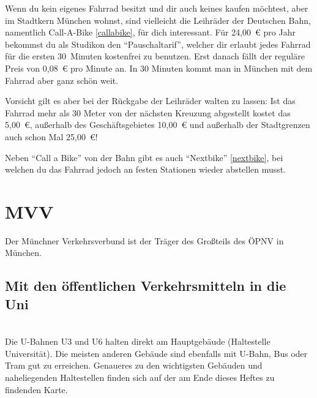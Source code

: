 Wenn du kein eigenes Fahrrad besitzt und dir auch keines kaufen möchtest, aber im
Stadtkern München wohnst, sind vielleicht die Leihräder der Deutschen Bahn,
namentlich Call-A-Bike \ref{callabike}, für dich interessant. Für 24,00~€ pro
Jahr bekommst du als Studikon den ``Pauschaltarif'', welcher dir erlaubt jedes
Fahrrad für die ersten 30~Minuten kostenfrei zu benutzen. Erst danach fällt der
reguläre Preis von 0,08~€ pro Minute an. In 30 Minuten kommt man in München mit dem Fahrrad
aber ganz schön weit.

Vorsicht gilt es aber bei der Rückgabe der Leihräder walten zu lassen: Ist das
Fahrrad mehr als 30 Meter von der nächsten Kreuzung abgestellt kostet das
5,00~€, außerhalb des Geschäftsgebietes 10,00~€ und außerhalb der Stadtgrenzen
auch schon Mal 25,00~€!

Neben ``Call a Bike'' von der Bahn gibt es auch ``Nextbike'' \ref{nextbike}, bei
welchen du das Fahrrad jedoch an festen Stationen wieder abstellen musst.

\begin{urlList}
\end{urlList}



\section{MVV}
Der Münchner Verkehrsverbund ist der Träger des Großteils des ÖPNV in München.

\subsection*{Mit den öffentlichen Verkehrsmitteln in die Uni}\hfill\\
Die U-Bahnen U3 und U6 halten direkt am Hauptgebäude (Haltestelle Universität).
Die meisten anderen Gebäude sind ebenfalls mit U-Bahn, Bus oder Tram gut zu
erreichen. Genaueres zu den wichtigsten Gebäuden und naheliegenden Haltestellen
finden sich auf der am Ende dieses Heftes zu findenden Karte.

